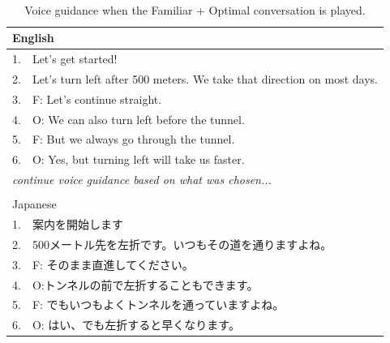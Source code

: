 \begin{table}[h]
\centering
\caption{Voice guidance when the Familiar + Optimal conversation is played.}~\label{tab:b-FO}
\begin{tabular}{ll}
\hline
\multicolumn{2}{l}{English}                                                                      \\ \hline
1.                      & Let's get started!                                                     \\
2.                      & Let's turn left after 500 meters. We take that direction on most days. \\ \hline
\multicolumn{1}{|l}{3.} & \multicolumn{1}{l|}{F: Let's continue straight.}                       \\
\multicolumn{1}{|l}{4.} & \multicolumn{1}{l|}{O: We can also turn left before the tunnel.}                    \\
\multicolumn{1}{|l}{5.} & \multicolumn{1}{l|}{F: But we always go through the tunnel.}                        \\
\multicolumn{1}{|l}{6.} & \multicolumn{1}{l|}{O: Yes, but turning left will take us faster.}                  \\ \hline
\multicolumn{2}{l}{\textit{continue voice guidance based on what was chosen...}}                              \\
                        &                                                                        \\ \hline
\multicolumn{2}{l}{Japanese}                                                                     \\ \hline
1.                      & 案内を開始します                                                               \\
2.                      & 500メートル先を左折です。いつもその道を通りますよね。                                           \\ \hline
\multicolumn{1}{|l}{3.} & \multicolumn{1}{l|}{F: そのまま直進してください。}                                  \\
\multicolumn{1}{|l}{4.} & \multicolumn{1}{l|}{O:トンネルの前で左折することもできます。}                             \\
\multicolumn{1}{|l}{5.} & \multicolumn{1}{l|}{F: でもいつもよくトンネルを通っていますよね。}                          \\
\multicolumn{1}{|l}{6.} & \multicolumn{1}{l|}{O: はい、でも左折すると早くなります。}                              \\ \hline

\end{tabular}
\end{table}
